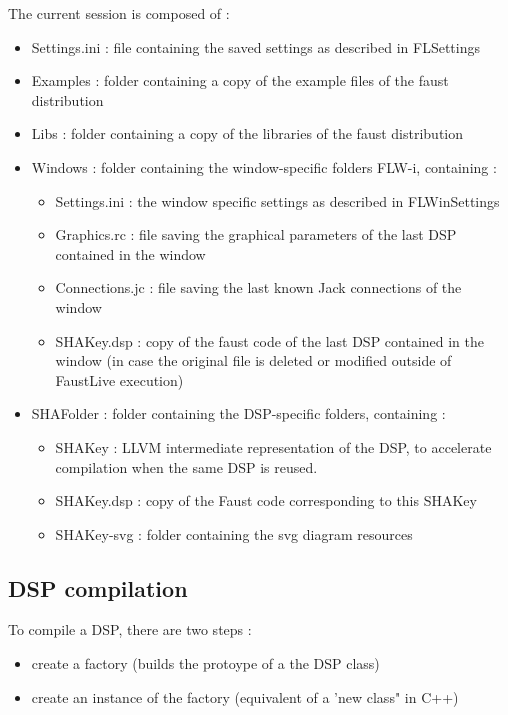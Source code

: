 \documentclass[a4paper]{article}
\begin{document}
The current session is composed of : 
\begin{itemize}
\item Settings.ini : file containing the saved settings as described in FLSettings
\item Examples : folder containing a copy of the example files of the faust distribution
\item Libs : folder containing a copy of the libraries of the faust distribution
\item Windows : folder containing the window-specific folders FLW-i, containing :
	\begin{itemize}
		\item Settings.ini : the window specific settings as described in FLWinSettings
		\item Graphics.rc : file saving the graphical parameters of the last DSP contained in the window
		\item Connections.jc : file saving the last known Jack connections of the window
		\item SHAKey.dsp : copy of the faust code of the last DSP contained in the window (in case the original file is deleted or modified outside of FaustLive execution)
	\end{itemize}
\item SHAFolder : folder containing the DSP-specific folders, containing : 
	\begin{itemize}
		\item SHAKey : LLVM intermediate representation of the DSP, to accelerate compilation when the same DSP is reused.
		\item SHAKey.dsp : copy of the Faust code corresponding to this SHAKey
		\item SHAKey-svg : folder containing the svg diagram resources
	\end{itemize}
\end{itemize}


\subsection{DSP compilation}

To compile a DSP, there are two steps :
\begin{itemize}
\item create a factory (builds the protoype of a the DSP class)
\item create an instance of the factory (equivalent of a 'new class" in C++)
\end{itemize}
\end{document}

